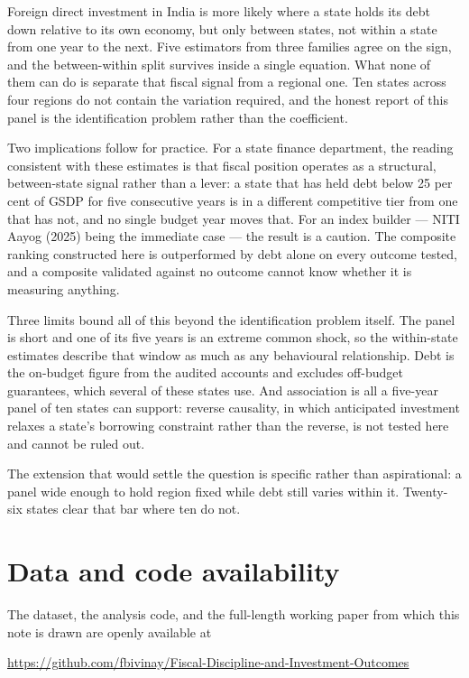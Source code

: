 \documentclass[12pt]{article}
\begin{document}
Foreign direct investment in India is more likely where a state holds its debt
down relative to its own economy, but only between states, not within a state
from one year to the next. Five estimators from three families agree on the sign,
and the between-within split survives inside a single equation. What none of them
can do is separate that fiscal signal from a regional one. Ten states across four
regions do not contain the variation required, and the honest report of this
panel is the identification problem rather than the coefficient.

Two implications follow for practice. For a state finance department, the reading
consistent with these estimates is that fiscal position operates as a structural,
between-state signal rather than a lever: a state that has held debt below 25 per
cent of GSDP for five consecutive years is in a different competitive tier from
one that has not, and no single budget year moves that. For an index builder ---
NITI Aayog (2025) being the immediate case --- the result is a caution. The
composite ranking constructed here is outperformed by debt alone on every outcome
tested, and a composite validated against no outcome cannot know whether it is
measuring anything.

Three limits bound all of this beyond the identification problem itself. The
panel is short and one of its five years is an extreme common shock, so the
within-state estimates describe that window as much as any behavioural
relationship. Debt is the on-budget figure from the audited accounts and excludes
off-budget guarantees, which several of these states use. And association is all
a five-year panel of ten states can support: reverse causality, in which
anticipated investment relaxes a state's borrowing constraint rather than the
reverse, is not tested here and cannot be ruled out.

The extension that would settle the question is specific rather than aspirational:
a panel wide enough to hold region fixed while debt still varies within it.
Twenty-six states clear that bar where ten do not.

\section*{Data and code availability}

The dataset, the analysis code, and the full-length working paper from which this
note is drawn are openly available at

\begin{center}
\href{https://github.com/fbivinay/Fiscal-Discipline-and-Investment-Outcomes}%
{\uline{https://github.com/fbivinay/Fiscal-Discipline-and-Investment-Outcomes}}
\end{center}
\end{document}
